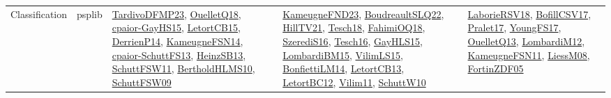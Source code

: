 {\begin{longtable}{llp{6cm}p{6cm}p{6cm}}
Classification & psplib & \href{papers/TardivoDFMP23.pdf}{TardivoDFMP23}\cite{TardivoDFMP23}, \href{papers/OuelletQ18.pdf}{OuelletQ18}\cite{OuelletQ18}, \href{papers/cpaior-GayHS15.pdf}{cpaior-GayHS15}\cite{cpaior-GayHS15}, \href{articles/LetortCB15.pdf}{LetortCB15}\cite{LetortCB15}, \href{papers/DerrienP14.pdf}{DerrienP14}\cite{DerrienP14}, \href{articles/KameugneFSN14.pdf}{KameugneFSN14}\cite{KameugneFSN14}, \href{papers/cpaior-SchuttFS13.pdf}{cpaior-SchuttFS13}\cite{cpaior-SchuttFS13}, \href{articles/HeinzSB13.pdf}{HeinzSB13}\cite{HeinzSB13}, \href{articles/SchuttFSW11.pdf}{SchuttFSW11}\cite{SchuttFSW11}, \href{papers/BertholdHLMS10.pdf}{BertholdHLMS10}\cite{BertholdHLMS10}, \href{papers/SchuttFSW09.pdf}{SchuttFSW09}\cite{SchuttFSW09} & \href{papers/KameugneFND23.pdf}{KameugneFND23}\cite{KameugneFND23}, \href{papers/BoudreaultSLQ22.pdf}{BoudreaultSLQ22}\cite{BoudreaultSLQ22}, \href{papers/HillTV21.pdf}{HillTV21}\cite{HillTV21}, \href{papers/Tesch18.pdf}{Tesch18}\cite{Tesch18}, \href{articles/FahimiOQ18.pdf}{FahimiOQ18}\cite{FahimiOQ18}, \href{papers/SzerediS16.pdf}{SzerediS16}\cite{SzerediS16}, \href{papers/Tesch16.pdf}{Tesch16}\cite{Tesch16}, \href{papers/GayHLS15.pdf}{GayHLS15}\cite{GayHLS15}, \href{papers/LombardiBM15.pdf}{LombardiBM15}\cite{LombardiBM15}, \href{papers/VilimLS15.pdf}{VilimLS15}\cite{VilimLS15}, \href{papers/BonfiettiLM14.pdf}{BonfiettiLM14}\cite{BonfiettiLM14}, \href{papers/LetortCB13.pdf}{LetortCB13}\cite{LetortCB13}, \href{papers/LetortBC12.pdf}{LetortBC12}\cite{LetortBC12}, \href{papers/Vilim11.pdf}{Vilim11}\cite{Vilim11}, \href{papers/SchuttW10.pdf}{SchuttW10}\cite{SchuttW10} & \href{articles/LaborieRSV18.pdf}{LaborieRSV18}\cite{LaborieRSV18}, \href{papers/BofillCSV17.pdf}{BofillCSV17}\cite{BofillCSV17}, \href{papers/Pralet17.pdf}{Pralet17}\cite{Pralet17}, \href{papers/YoungFS17.pdf}{YoungFS17}\cite{YoungFS17}, \href{papers/OuelletQ13.pdf}{OuelletQ13}\cite{OuelletQ13}, \href{articles/LombardiM12.pdf}{LombardiM12}\cite{LombardiM12}, \href{papers/KameugneFSN11.pdf}{KameugneFSN11}\cite{KameugneFSN11}, \href{articles/LiessM08.pdf}{LiessM08}\cite{LiessM08}, \href{papers/FortinZDF05.pdf}{FortinZDF05}\cite{FortinZDF05}\\

\end{longtable}}
